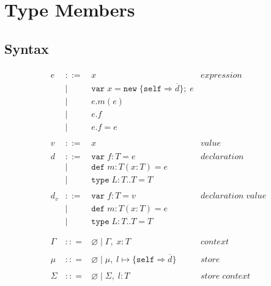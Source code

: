 \documentclass{llncs}
\begin{document}
\section{Type Members}

\subsection{Syntax}



\[
\begin{array}{lll}
\begin{array}{lllr}
e & ::= & x & expression \\
& | & \texttt{var} \; x = \texttt{new} \; \{\texttt{self} \Rightarrow \overline{d}\}; \; e&\\
& | & e.m(e) &\\
& | & e.f &\\
& | & e.f = e&\\
&&\\
v & ::= & x & value \\
&&\\
d & ::= & \texttt{var} \; f : T = e & declaration \\
  & |   & \texttt{def} \; m : T(x:T) = e &\\
  & |   & \texttt{type} \; L : T .. T = T &\\
&&\\
d_v & ::= & \texttt{var} \; f : T = v & declaration \; value \\
  & |   & \texttt{def} \; m : T(x:T) = e &\\
  & |   & \texttt{type} \; L : T .. T = T &\\
&&\\
&&\\
\Gamma & :: = & \varnothing \; | \; \Gamma, \; x : T & context \\
&&\\
\mu & :: = & \varnothing \; | \; \mu,\; l \mapsto \{\texttt{self} \Rightarrow \overline{d}\} & store \\
&&\\
\Sigma & :: = & \varnothing \; | \; \Sigma,\; l : T & store \; context \\
\end{array}

\end{array}\]
\end{document}
